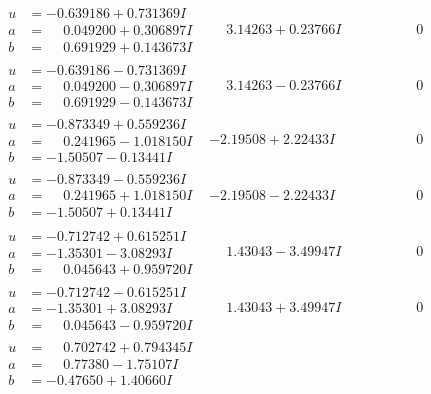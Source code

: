 \documentclass[1p]{elsarticle_modified}
\theoremstyle{definition}
\begin{document}
$$\begin{array}{c|c|c}
\begin{aligned}
u &= -0.639186 + 0.731369 I \\
a &= \phantom{-}0.049200 + 0.306897 I \\
b &= \phantom{-}0.691929 + 0.143673 I\end{aligned}
 & \phantom{-}3.14263 + 0.23766 I & \phantom{-0.000000 } 0 \\ \hline\begin{aligned}
u &= -0.639186 - 0.731369 I \\
a &= \phantom{-}0.049200 - 0.306897 I \\
b &= \phantom{-}0.691929 - 0.143673 I\end{aligned}
 & \phantom{-}3.14263 - 0.23766 I & \phantom{-0.000000 } 0 \\ \hline\begin{aligned}
u &= -0.873349 + 0.559236 I \\
a &= \phantom{-}0.241965 - 1.018150 I \\
b &= -1.50507 - 0.13441 I\end{aligned}
 & -2.19508 + 2.22433 I & \phantom{-0.000000 } 0 \\ \hline\begin{aligned}
u &= -0.873349 - 0.559236 I \\
a &= \phantom{-}0.241965 + 1.018150 I \\
b &= -1.50507 + 0.13441 I\end{aligned}
 & -2.19508 - 2.22433 I & \phantom{-0.000000 } 0 \\ \hline\begin{aligned}
u &= -0.712742 + 0.615251 I \\
a &= -1.35301 - 3.08293 I \\
b &= \phantom{-}0.045643 + 0.959720 I\end{aligned}
 & \phantom{-}1.43043 - 3.49947 I & \phantom{-0.000000 } 0 \\ \hline\begin{aligned}
u &= -0.712742 - 0.615251 I \\
a &= -1.35301 + 3.08293 I \\
b &= \phantom{-}0.045643 - 0.959720 I\end{aligned}
 & \phantom{-}1.43043 + 3.49947 I & \phantom{-0.000000 } 0 \\ \hline\begin{aligned}
u &= \phantom{-}0.702742 + 0.794345 I \\
a &= \phantom{-}0.77380 - 1.75107 I \\
b &= -0.47650 + 1.40660 I\end{aligned}

\end{array}$$
\end{document}
